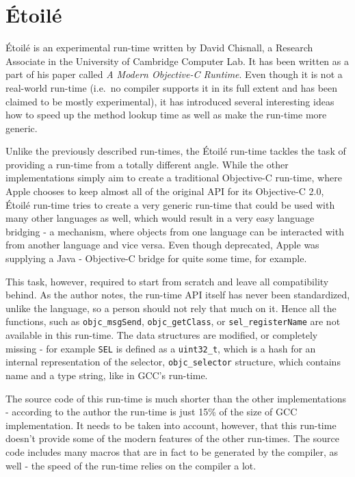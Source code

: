 \chapter{\'Etoil\'e}

\'Etoil\'e is an experimental run-time written by David Chisnall, a Research Associate in the University of Cambridge Computer Lab. It has been written as a part of his paper called \emph{A Modern Objective-C Runtime}\cite{etoile_article}. Even though it is not a real-world run-time (i.e.\ no compiler supports it in its full extent and has been claimed to be mostly experimental), it has introduced several interesting ideas how to speed up the method lookup time as well as make the run-time more generic.

Unlike the previously described run-times, the \'Etoil\'e run-time tackles the task of providing a run-time from a totally different angle. While the other implementations simply aim to create a traditional Objective-C run-time, where Apple chooses to keep almost all of the original API for its Objective-C 2.0, \'Etoil\'e run-time tries to create a very generic run-time that could be used with many other languages as well, which would result in a very easy language bridging - a mechanism, where objects from one language can be interacted with from another language and vice versa. Even though deprecated, Apple was supplying a Java - Objective-C bridge for quite some time\cite{java_bridge}, for example.

This task, however, required to start from scratch and leave all compatibility behind. As the author notes, the run-time API itself has never been standardized, unlike the language, so a person should not rely that much on it. Hence all the functions, such as \verb=objc_msgSend=, \verb=objc_getClass=, or \verb=sel_registerName= are not available in this run-time. The data structures are modified, or completely missing - for example \verb=SEL= is defined as a \verb=uint32_t=, which is a hash for an internal representation of the selector, \verb=objc_selector= structure, which contains name and a type string, like in GCC's run-time. 

The source code of this run-time is much shorter than the other implementations - according to the author the run-time is just 15\% of the size of GCC implementation. It needs to be taken into account, however, that this run-time doesn't provide some of the modern features of the other run-times. The source code includes many macros that are in fact to be generated by the compiler, as well - the speed of the run-time relies on the compiler a lot.

